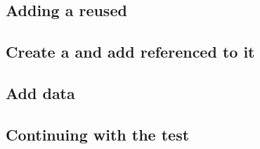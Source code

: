 

\subsection{Adding a reused \gdproject{}}

 
\subsection{Create a \gdcase{} and add referenced \gdcases{} to it}


\subsection{Add data}


\subsection{Continuing with the test}


